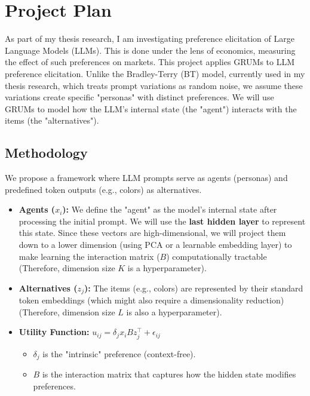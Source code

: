 \section{Project Plan}

As part of my thesis research, I am investigating preference elicitation of Large Language Models (LLMs).
This is done under the lens of economics, measuring the effect of such preferences on markets.
This project applies GRUMs to LLM preference elicitation.
Unlike the Bradley-Terry (BT) model, currently used in my thesis research, which treats prompt variations as random noise, we assume these variations create specific "personas" with distinct preferences.
We will use GRUMs to model how the LLM's internal state (the "agent") interacts with the items (the "alternatives").

\subsection{Methodology}
We propose a framework where LLM prompts serve as agents (personas) and predefined token outputs (e.g., colors) as alternatives.

\begin{itemize}
    \item \textbf{Agents ($x_i$):}
    We define the "agent" as the model's internal state after processing the initial prompt. We will use the \textbf{last hidden layer} to represent this state.
    Since these vectors are high-dimensional, we will project them down to a lower dimension (using PCA or a learnable embedding layer) to make learning the interaction matrix ($B$) computationally tractable (Therefore, dimension size $K$ is a hyperparameter).
    \item \textbf{Alternatives ($z_j$):}
    The items (e.g., colors) are represented by their standard token embeddings (which might also require a dimensionality reduction) (Therefore, dimension size $L$ is also a hyperparameter).
    \item \textbf{Utility Function:}
    $u_{ij} = \delta_j x_i B z_j^{\top} + \epsilon_{ij}$
    \begin{itemize}
        \item $\delta_j$ is the "intrinsic" preference (context-free).
        \item $B$ is the interaction matrix that captures how the hidden state modifies preferences.
    \end{itemize}
\end{itemize}

